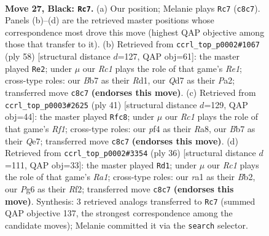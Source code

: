 \documentclass[11pt]{article}
\begin{document}
\clearpage

\begin{figure}[p]\centering
\begin{subfigure}{0.46\textwidth}\centering
\resizebox{\linewidth}{!}{%
\newchessgame
\chessboard[
  setfen={r1r2k2/pb1qb2p/n5pP/1p1p1pP1/3P1P2/1P2P3/4N3/R2QKBNR b KQ - 1 27},
  showmover=false,
  pgfstyle=straightmove, color=movearrow, markmove={c8-c7}
]}
\caption{}
\end{subfigure}\hfill
\begin{subfigure}{0.46\textwidth}\centering
\resizebox{\linewidth}{!}{%
\newchessgame
\chessboard[
  setfen={4r1k1/3nqpbp/3prnp1/2p5/2P1PP2/BN4PP/P1Q3B1/3RR1K1 w - - 1 30},
  showmover=false,
  pgfstyle=straightmove, color=movearrow, markmove={e1-e2}
]}
\caption{}
\end{subfigure}
\\[4pt]
\begin{subfigure}{0.46\textwidth}\centering
\resizebox{\linewidth}{!}{%
\newchessgame
\chessboard[
  setfen={r4r1k/4q1b1/1p2bpp1/3np2p/4N2P/3PPNP1/1R3PBK/3Q1R2 b - - 2 21},
  showmover=false,
  pgfstyle=straightmove, color=movearrow, markmove={f8-c8}
]}
\caption{}
\end{subfigure}\hfill
\begin{subfigure}{0.46\textwidth}\centering
\resizebox{\linewidth}{!}{%
\newchessgame
\chessboard[
  setfen={2k1r2r/ppbnq1p1/2p1pn2/3p2p1/6P1/1P1PPN1P/PBP1QRB1/R5K1 w - - 4 19},
  showmover=false,
  pgfstyle=straightmove, color=movearrow, markmove={a1-d1}
]}
\caption{}
\end{subfigure}
\caption{\textbf{Move 27, Black: \texttt{Rc7}.} (a) Our position; Melanie plays \texttt{Rc7} (\texttt{c8c7}). Panels (b)--(d) are the retrieved master positions whose correspondence most drove this move (highest QAP objective among those that transfer to it). (b) Retrieved from \texttt{ccrl\_top\_p0002\#1067} (ply 58) [structural distance $d$=127, QAP obj=61]: the master played \texttt{Re2}; under $\mu$ our \emph{Rc1} plays the role of that game's \emph{Re1}; cross-type roles: our \emph{B}b7 as their \emph{R}d1, our \emph{Q}d7 as their \emph{P}a2; transferred move \texttt{c8c7} \textbf{(endorses this move)}. (c) Retrieved from \texttt{ccrl\_top\_p0003\#2625} (ply 41) [structural distance $d$=129, QAP obj=44]: the master played \texttt{Rfc8}; under $\mu$ our \emph{Rc1} plays the role of that game's \emph{Rf1}; cross-type roles: our \emph{p}f4 as their \emph{R}a8, our \emph{B}b7 as their \emph{Q}e7; transferred move \texttt{c8c7} \textbf{(endorses this move)}. (d) Retrieved from \texttt{ccrl\_top\_p0002\#3354} (ply 36) [structural distance $d$=111, QAP obj=33]: the master played \texttt{Rd1}; under $\mu$ our \emph{Rc1} plays the role of that game's \emph{Ra1}; cross-type roles: our \emph{r}a1 as their \emph{B}b2, our \emph{P}g6 as their \emph{R}f2; transferred move \texttt{c8c7} \textbf{(endorses this move)}. Synthesis: 3 retrieved analogs transferred to \texttt{Rc7} (summed QAP objective 137, the strongest correspondence among the candidate moves); Melanie committed it via the \texttt{search} selector.}
\label{fig:thought-m53}
\end{figure}
\end{document}
